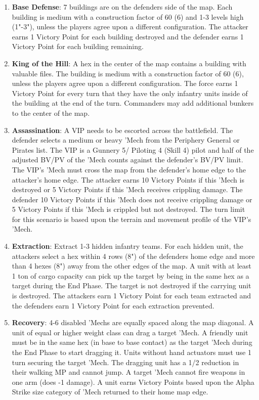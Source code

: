 \begin{enumerate}
\item {\bfseries Base Defense}: 7 buildings are on the defenders side of the map.
Each building is medium with a construction factor of 60 (6) and 1-3 levels high (1"-3"), unless the players agree upon a different configuration.
The attacker earns 1 Victory Point for each building destroyed and the defender earns 1 Victory Point for each building remaining.

\item {\bfseries King of the Hill}: A hex in the center of the map contains a building with valuable files.
The building is medium with a construction factor of 60 (6), unless the players agree upon a different configuration.
The force earns 1 Victory Point for every turn that they have the only infantry units inside of the building at the end of the turn.
Commanders may add additional bunkers to the center of the map.

\item {\bfseries Assassination}: A VIP needs to be escorted across the battlefield.
The defender selects a medium or heavy 'Mech from the Periphery General or Pirates list.
The VIP is a Gunnery 5/ Piloting 4 (Skill 4) pilot and half of the adjusted BV/PV of the 'Mech counts against the defender's BV/PV limit.
The VIP's 'Mech must cross the map from the defender's home edge to the attacker's home edge.
The attacker earns 10 Victory Points if this 'Mech is destroyed or 5 Victory Points if this 'Mech receives crippling damage.
The defender 10 Victory Points if this 'Mech does not receive crippling damage or 5 Victory Points if this 'Mech is crippled but not destroyed.
The turn limit for this scenario is based upon the terrain and movement profile of the VIP's 'Mech.

\item {\bfseries Extraction}: Extract 1-3 hidden infantry teams.
For each hidden unit, the attackers select a hex within 4 rows (8") of the defenders home edge and more than 4 hexes (8") away from the other edges of the map.
A unit with at least 1 ton of cargo capacity can pick up the target by being in the same hex as a target during the End Phase.
The target is not destroyed if the carrying unit is destroyed.
The attackers earn 1 Victory Point for each team extracted and the defenders earn 1 Victory Point for each extraction prevented.

\item {\bfseries Recovery}: 4-6 disabled 'Mechs are equally spaced along the map diagonal.
A unit of equal or higher weight class can drag a target 'Mech.
A friendly unit must be in the same hex (in base to base contact) as the target 'Mech during the End Phase to start dragging it.
Units without hand actuators must use 1 turn securing the target 'Mech.
The dragging unit has a 1/2 reduction in their walking MP and cannot jump.
A target 'Mech cannot fire weapons in one arm (does -1 damage).
A unit earns Victory Points based upon the Alpha Strike size category of 'Mech returned to their home map edge.

\end{enumerate}
